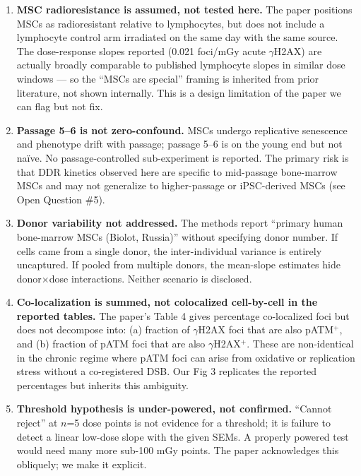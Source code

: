 \documentclass[11pt]{article}
\begin{document}
\begin{enumerate}[leftmargin=1.5em]
\item \textbf{MSC radioresistance is assumed, not tested here.} The paper positions MSCs
as radioresistant relative to lymphocytes, but does not include a lymphocyte control arm
irradiated on the same day with the same source. The dose-response slopes reported
(0.021 foci/mGy acute $\gamma$H2AX) are actually broadly comparable to published
lymphocyte slopes in similar dose windows --- so the ``MSCs are special''
framing is inherited from prior literature, not shown internally. This is a design
limitation of the paper we can flag but not fix.

\item \textbf{Passage 5--6 is not zero-confound.} MSCs undergo replicative senescence
and phenotype drift with passage; passage 5--6 is on the young end but not na\"ive. No
passage-controlled sub-experiment is reported. The primary risk is that DDR kinetics
observed here are specific to mid-passage bone-marrow MSCs and may not generalize to
higher-passage or iPSC-derived MSCs (see Open Question \#5).

\item \textbf{Donor variability not addressed.} The methods report ``primary human
bone-marrow MSCs (Biolot, Russia)'' without specifying donor number. If cells came from
a single donor, the inter-individual variance is entirely uncaptured. If pooled from
multiple donors, the mean-slope estimates hide donor$\times$dose interactions. Neither
scenario is disclosed.

\item \textbf{Co-localization is summed, not colocalized cell-by-cell in the reported
tables.} The paper's Table 4 gives percentage co-localized foci but does not decompose
into: (a) fraction of $\gamma$H2AX foci that are also pATM$^+$, and (b) fraction of pATM
foci that are also $\gamma$H2AX$^+$. These are non-identical in the chronic regime where
pATM foci can arise from oxidative or replication stress without a co-registered DSB.
Our Fig 3 replicates the reported percentages but inherits this ambiguity.

\item \textbf{Threshold hypothesis is under-powered, not confirmed.} ``Cannot reject''
at $n$=5 dose points is not evidence for a threshold; it is failure to detect a linear
low-dose slope with the given SEMs. A properly powered test would need many more
sub-100 mGy points. The paper acknowledges this obliquely; we make it explicit.


\end{enumerate}
\end{document}
